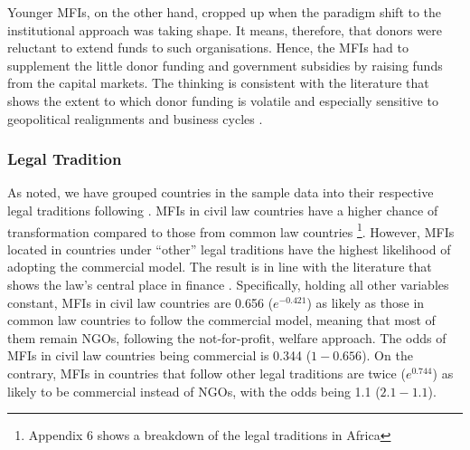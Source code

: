 \documentclass[a4paper,nobind]{templates/ociamthesis}
\begin{document}
Younger MFIs, on the other hand, cropped up when the paradigm shift to the institutional approach was taking shape. It means, therefore, that donors were reluctant to extend funds to such organisations. Hence, the MFIs had to supplement the little donor funding and government subsidies by raising funds from the capital markets. The thinking is consistent with the literature that shows the extent to which donor funding is volatile and especially sensitive to geopolitical realignments \autocite{garmaise2013cheap,d2017aid} and business cycles \autocite{wagner2013vulnerability}.

\hypertarget{legal-tradition}{%
\subsubsection{Legal Tradition}\label{legal-tradition}}

As noted, we have grouped countries in the sample data into their respective legal traditions following \textcite{oto2014distribution}. MFIs in civil law countries have a higher chance of transformation compared to those from common law countries \footnote{Appendix 6 shows a breakdown of the legal traditions in Africa}. However, MFIs located in countries under ``other'' legal traditions have the highest likelihood of adopting the commercial model. The result is in line with the literature that shows the law's central place in finance \autocite{la2013law}. Specifically, holding all other variables constant, MFIs in civil law countries are 0.656 (\(e^{-0.421}\)) as likely as those in common law countries to follow the commercial model, meaning that most of them remain NGOs, following the not-for-profit, welfare approach. The odds of MFIs in civil law countries being commercial is 0.344 (\(1 - 0.656\)). On the contrary, MFIs in countries that follow other legal traditions are twice (\(e^{0.744}\)) as likely to be commercial instead of NGOs, with the odds being 1.1 (\(2.1 - 1.1\)).
\end{document}
